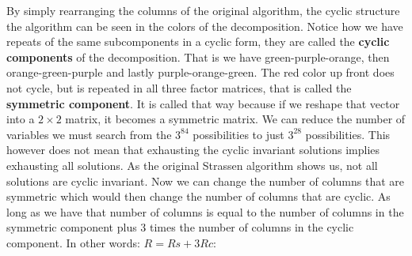 \documentclass[MS]{wfuthesis}
\begin{document}
\begin{multicols}{2}
                    \end{multicols}
                    
                    By simply rearranging the columns of the original algorithm, the cyclic structure the algorithm can be seen in the colors of the decomposition. Notice how we have repeats of the same subcomponents in a cyclic form, they are called the \textbf{cyclic components} of the decomposition. That is we have green-purple-orange, then orange-green-purple and lastly purple-orange-green. The red color up front does not cycle, but is repeated in all three factor matrices, that is called the \textbf{symmetric component}. It is called that way because if we reshape that vector into a $2 \times 2$ matrix, it becomes a symmetric matrix. We can reduce the number of variables we must search from the $3^{84}$ possibilities to just $3^{28}$ possibilities. This however does not mean that exhausting the cyclic invariant solutions implies exhausting all solutions. As the original Strassen algorithm shows us, not all solutions are cyclic invariant. Now we can change the number of columns that are symmetric which would then change the number of columns that are cyclic. As long as we have that number of columns is equal to the number of columns in the symmetric component plus 3 times the number of columns in the cyclic component. In other words: \(R = Rs + 3Rc\):
\end{document}
